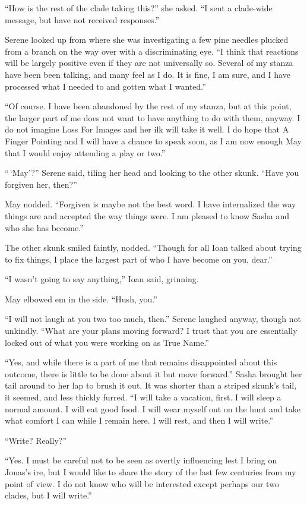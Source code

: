 ``How is the rest of the clade taking this?'' she asked. ``I sent a clade-wide message, but have not received responses.''

Serene looked up from where she was investigating a few pine needles plucked from a branch on the way over with a discriminating eye. ``I think that reactions will be largely positive even if they are not universally so. Several of my stanza have been been talking, and many feel as I do. It is fine, I am sure, and I have processed what I needed to and gotten what I wanted.''

``Of course. I have been abandoned by the rest of my stanza, but at this point, the larger part of me does not want to have anything to do with them, anyway. I do not imagine Loss For Images and her ilk will take it well. I do hope that A Finger Pointing and I will have a chance to speak soon, as I am now enough May that I would enjoy attending a play or two.''

``\,`May'?'' Serene said, tiling her head and looking to the other skunk. ``Have you forgiven her, then?''

May nodded. ``Forgiven is maybe not the best word. I have internalized the way things are and accepted the way things were. I am pleased to know Sasha and who she has become.''

The other skunk smiled faintly, nodded. ``Though for all Ioan talked about trying to fix things, I place the largest part of who I have become on you, dear.''

``I wasn't going to say anything,'' Ioan said, grinning.

May elbowed em in the side. ``Hush, you.''

``I will not laugh at you two too much, then.'' Serene laughed anyway, though not unkindly. ``What are your plans moving forward? I trust that you are essentially locked out of what you were working on as True Name.''

``Yes, and while there is a part of me that remains disappointed about this outcome, there is little to be done about it but move forward.'' Sasha brought her tail around to her lap to brush it out. It was shorter than a striped skunk's tail, it seemed, and less thickly furred. ``I will take a vacation, first. I will sleep a normal amount. I will eat good food. I will wear myself out on the hunt and take what comfort I can while I remain here. I will rest, and then I will write.''

``Write? Really?''

``Yes. I must be careful not to be seen as overtly influencing lest I bring on Jonas's ire, but I would like to share the story of the last few centuries from my point of view. I do not know who will be interested except perhaps our two clades, but I will write.''

